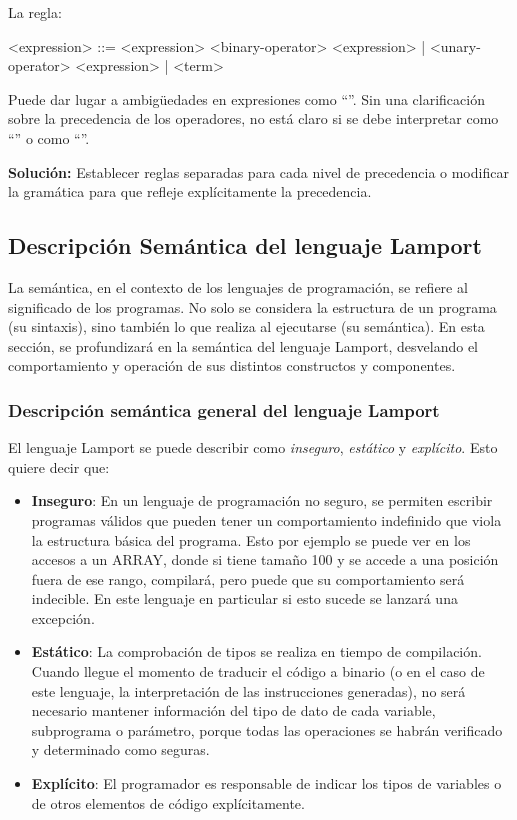 \noindent
La regla:
\begin{BNFCode}
<expression> ::= <expression> <binary-operator> <expression>
| <unary-operator> <expression>
| <term>
\end{BNFCode}

\vspace{0.5cm}

Puede dar lugar a ambigüedades en expresiones como ``''. Sin una clarificación sobre la precedencia de los operadores, no está claro si se debe interpretar como ``'' o como ``''.

\vspace{0.5cm}

\textbf{Solución:} Establecer reglas separadas para cada nivel de precedencia o modificar la gramática para que refleje explícitamente la precedencia.


\subsection{Descripción Semántica del lenguaje Lamport}\label{subsec:semanticaLamport}

La semántica, en el contexto de los lenguajes de programación, se refiere al significado de los programas. No solo se considera la estructura de un programa (su sintaxis), sino también lo que realiza al ejecutarse (su semántica). En esta sección, se profundizará en la semántica del lenguaje Lamport, desvelando el comportamiento y operación de sus distintos constructos y componentes.

\subsubsection{Descripción semántica general del lenguaje Lamport}
El lenguaje Lamport se puede describir como \textit{inseguro}, \textit{estático} y \textit{explícito}. Esto quiere decir que:

\begin{itemize}
    \item \textbf{Inseguro}: En un lenguaje de programación no seguro, se permiten escribir programas válidos que pueden tener un comportamiento indefinido que viola la estructura básica del programa. Esto por ejemplo se puede ver en los accesos a un ARRAY, donde si tiene tamaño 100 y se accede a una posición fuera de ese rango, compilará, pero puede que su comportamiento será indecible. En este lenguaje en particular si esto sucede se lanzará una excepción.
    \item \textbf{Estático}: La comprobación de tipos se realiza en tiempo de compilación. Cuando llegue el momento de traducir el código a binario (o en el caso de este lenguaje, la interpretación de las instrucciones generadas), no será necesario mantener información del tipo de dato de cada variable, subprograma o parámetro, porque todas las operaciones se habrán verificado y determinado como seguras.
    \item \textbf{Explícito}: El programador es responsable de indicar los tipos de variables o de otros elementos de código explícitamente.
\end{itemize}

